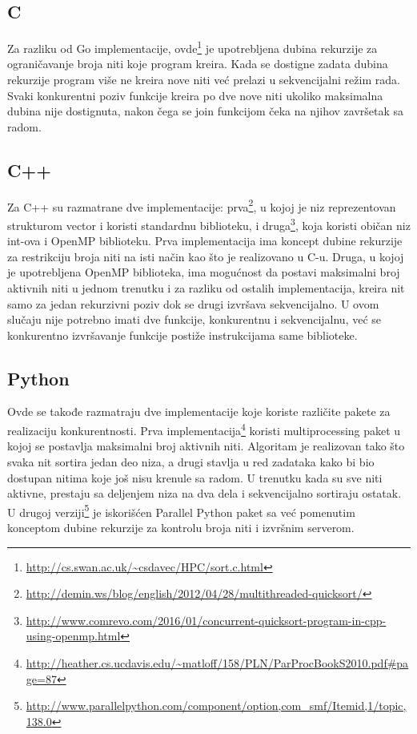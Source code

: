 \documentclass[12pt,oneside]{memoir}
\begin{document}
\subsection{C}
Za razliku od Go implementacije, ovde\footnote{\url{http://cs.swan.ac.uk/~csdavec/HPC/sort.c.html}} je upotrebljena dubina rekurzije za ograničavanje broja niti koje program kreira. Kada se dostigne zadata dubina rekurzije program više ne kreira nove niti već prelazi u sekvencijalni režim rada. Svaki konkurentni poziv funkcije kreira po dve nove niti ukoliko maksimalna dubina nije dostignuta, nakon čega se join funkcijom čeka na njihov završetak sa radom.

\subsection{C++}
Za C++ su razmatrane dve implementacije: prva\footnote{\url{http://demin.ws/blog/english/2012/04/28/multithreaded-quicksort/}}, u kojoj je niz reprezentovan strukturom vector i koristi standardnu biblioteku, i druga\footnote{\url{http://www.comrevo.com/2016/01/concurrent-quicksort-program-in-cpp-using-openmp.html}}, koja koristi običan niz int-ova i OpenMP biblioteku. 
Prva implementacija ima koncept dubine rekurzije za restrikciju broja niti na isti način kao što je realizovano u C-u. Druga, u kojoj je upotrebljena OpenMP biblioteka, ima mogućnost da postavi maksimalni broj aktivnih niti u jednom trenutku i za razliku od ostalih implementacija, kreira nit samo za jedan rekurzivni poziv dok se drugi izvršava sekvencijalno. U ovom slučaju nije potrebno imati dve funkcije, konkurentnu i sekvencijalnu, već se konkurentno izvršavanje funkcije postiže instrukcijama same biblioteke. 

\subsection{Python}
Ovde se takođe razmatraju dve implementacije koje koriste različite pakete za realizaciju konkurentnosti. Prva implementacija\footnote{\url{http://heather.cs.ucdavis.edu/~matloff/158/PLN/ParProcBookS2010.pdf\#page=87}} koristi multiprocessing paket u kojoj se postavlja maksimalni broj aktivnih niti. Algoritam je realizovan tako što svaka nit sortira jedan deo niza, a drugi stavlja u red zadataka kako bi bio dostupan nitima koje još nisu krenule sa radom. U trenutku kada su sve niti aktivne, prestaju sa deljenjem niza na dva dela i sekvencijalno sortiraju ostatak. U drugoj verziji\footnote{\url{http://www.parallelpython.com/component/option,com_smf/Itemid,1/topic,138.0}} je iskorišćen Parallel Python paket sa već pomenutim konceptom dubine rekurzije za kontrolu broja niti i izvršnim serverom. 
\end{document}
